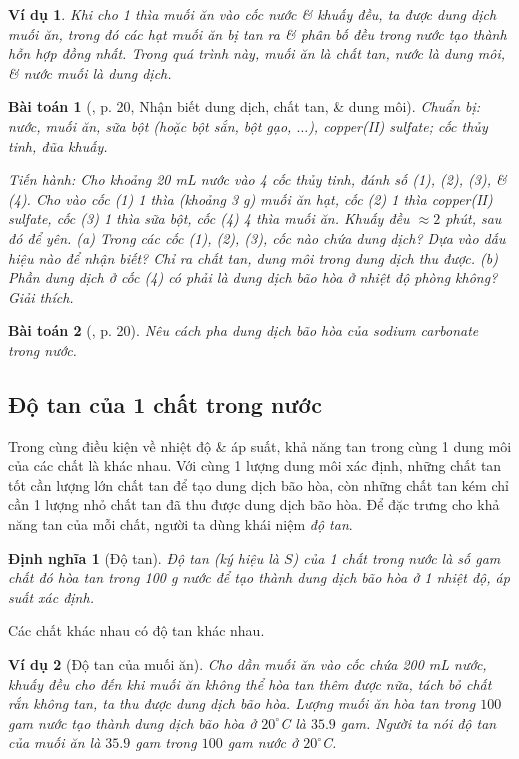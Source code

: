 \documentclass{article}
\newtheorem{baitoan}{Bài toán}
\newtheorem{dinhnghia}{Định nghĩa}
\newtheorem{vidu}{Ví dụ}
\begin{document}
\begin{vidu}
	Khi cho 1 thìa muối ăn vào cốc nước \& khuấy đều, ta được dung dịch muối ăn, trong đó các hạt muối ăn bị tan ra \& phân bố đều trong nước tạo thành hỗn hợp đồng nhất. Trong quá trình này, muối ăn là \emph{chất tan}, nước là \emph{dung môi}, \& nước muối là \emph{dung dịch}.
\end{vidu}

\begin{baitoan}[\cite{SGK_KHTN_8_KNTTVCS}, p. 20, Nhận biết dung dịch, chất tan, \& dung môi]
	\emph{Chuẩn bị:} nước, muối ăn, sữa bột (hoặc bột sắn, bột gạo, $\ldots$), copper(II) sulfate; cốc thủy tinh, đũa khuấy.
	
	\emph{Tiến hành:} Cho khoảng \emph{20 mL} nước vào 4 cốc thủy tinh, đánh số (1), (2), (3), \& (4). Cho vào cốc (1) 1 thìa (khoảng \emph{3 g}) muối ăn hạt, cốc (2) 1 thìa copper(II) sulfate, cốc (3) 1 thìa sữa bột, cốc (4) 4 thìa muối ăn. Khuấy đều $\approx2$ phút, sau đó để yên. (a) Trong các cốc (1), (2), (3), cốc nào chứa dung dịch? Dựa vào dấu hiệu nào để nhận biết? Chỉ ra chất tan, dung môi trong dung dịch thu được. (b) Phần dung dịch ở cốc (4) có phải là dung dịch bão hòa ở nhiệt độ phòng không? Giải thích.
\end{baitoan}

\begin{baitoan}[\cite{SGK_KHTN_8_KNTTVCS}, p. 20]
	Nêu cách pha dung dịch bão hòa của sodium carbonate \emph{} trong nước.
\end{baitoan}

\subsection{Độ tan của 1 chất trong nước}
Trong cùng điều kiện về nhiệt độ \& áp suất, khả năng tan trong cùng 1 dung môi của các chất là khác nhau. Với cùng 1 lượng dung môi xác định, những chất tan tốt cần lượng lớn chất tan để tạo dung dịch bão hòa, còn những chất tan kém chỉ cần 1 lượng nhỏ chất tan đã thu được dung dịch bão hòa. Để đặc trưng cho khả năng tan của mỗi chất, người ta dùng khái niệm \textit{độ tan}.

\begin{dinhnghia}[Độ tan]
	\emph{Độ tan} (ký hiệu là $S$) của 1 chất trong nước là số gam chất đó hòa tan trong \emph{100 g} nước để tạo thành dung dịch bão hòa ở 1 nhiệt độ, áp suất xác định.
\end{dinhnghia}
Các chất khác nhau có độ tan khác nhau.

\begin{vidu}[Độ tan của muối ăn]
	Cho dần muối ăn vào cốc chứa 200 mL nước, khuấy đều cho đến khi muối ăn không thể hòa tan thêm được nữa, tách bỏ chất rắn không tan, ta thu được dung dịch bão hòa. Lượng muối ăn hòa tan trong $100$ gam nước tạo thành dung dịch bão hòa ở $20^\circ$C là $35.9$ gam. Người ta nói \emph{độ tan của muối ăn} là $35.9$ gam trong $100$ gam nước ở $20^\circ$C.
\end{vidu}
\end{document}
